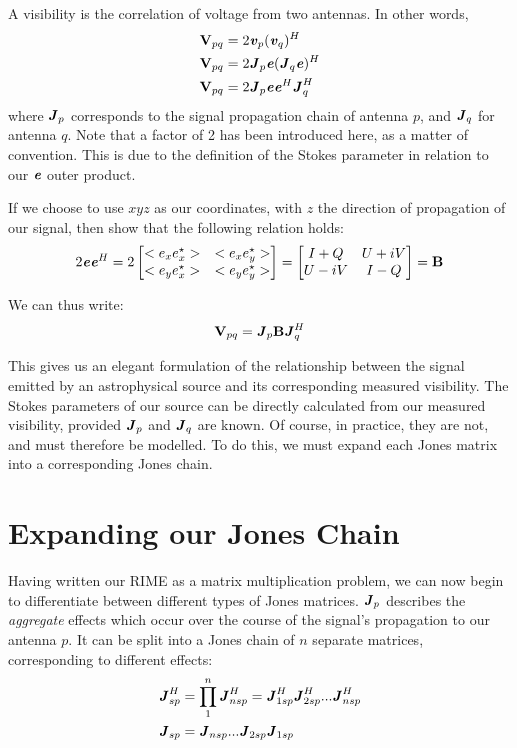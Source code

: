 \pg
A visibility is the correlation of voltage from two antennas. In other words,
\begin{align}
\textbf{V}_{pq} &= 2 \textbf{\emph{v}}_p (\textbf{\emph{v}}_q)^H\\
\textbf{V}_{pq} &= 2 \textbf{\emph{J}}_p \textbf{\emph{e}} (\textbf{\emph{J}}_q \textbf{\emph{e}})^H\\
\textbf{V}_{pq} &= 2 \textbf{\emph{J}}_p \textbf{\emph{e}} \textbf{\emph{e}}^H \textbf{\emph{J}}_q^H
\end{align}
where $\textbf{\emph{J}}_p$ corresponds to the signal propagation chain of antenna $p$, and $\textbf{\emph{J}}_q$ for antenna $q$. Note that a factor of 2 has been introduced here, as a matter of convention. This is due to the definition of the Stokes parameter in relation to our $\textbf{\emph{e}}$ outer product.

\pg
If we choose to use $xyz$ as our coordinates, with $z$ the direction of propagation of our signal, then  show that the following relation holds:
\begin{equation}
2 \textbf{\emph{e}} \textbf{\emph{e}}^H = 2  \begin{bmatrix} <e_x e_x^\star> & <e_x e_y^\star> \\ <e_y e_x^\star> & <e_y e_y^\star> \end{bmatrix} = \begin{bmatrix} I+Q & U+iV \\ U-iV & I-Q \end{bmatrix} = \textbf{B}
\end{equation}

\pg
We can thus write:
\begin{equation}
\textbf{V}_{pq} = \textbf{\emph{J}}_p \textbf{B} \textbf{\emph{J}}_q^H
\end{equation}

\pg
This gives us an elegant formulation of the relationship between the signal emitted by an astrophysical source and its corresponding measured visibility. The Stokes parameters of our source can be directly calculated from our measured visibility, provided $\textbf{\emph{J}}_p$ and $\textbf{\emph{J}}_q$ are known. Of course, in practice, they are not, and must therefore be modelled. To do this, we must expand each Jones matrix into a corresponding Jones chain.

\section{Expanding our Jones Chain}
\label{section.RIME.JonesChain}
\pg
Having written our RIME as a matrix multiplication problem, we can now begin to differentiate between different types of Jones matrices. $\textbf{\emph{J}}_p$ describes the \emph{aggregate} effects which occur over the course of the signal's propagation to our antenna $p$. It can be split into a Jones chain of $n$ separate matrices, corresponding to different effects:
\begin{align}
\displaystyle \textbf{\emph{J}}_{sp}^H &= \prod_1^n \textbf{\emph{J}}_{nsp}^H = \textbf{\emph{J}}_{1sp}^H \textbf{\emph{J}}_{2sp}^H ... \textbf{\emph{J}}_{nsp}^H\\
\displaystyle \textbf{\emph{J}}_{sp}   &= \textbf{\emph{J}}_{nsp}...\textbf{\emph{J}}_{2sp} \textbf{\emph{J}}_{1sp}
\end{align}

